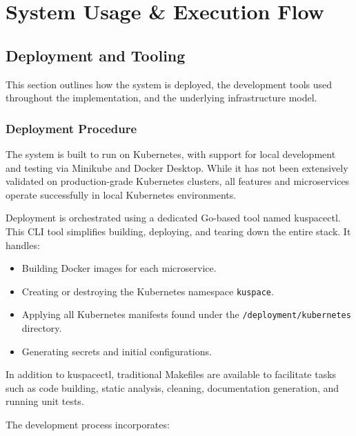 \chapter{System Usage \& Execution Flow}
\section{Deployment and Tooling}

This section outlines how the system is deployed, the development tools used 
throughout the implementation, and the underlying infrastructure model.

\subsection{Deployment Procedure}

The system is built to run on Kubernetes, with support for local development and testing via Minikube and Docker Desktop. While it has not been extensively validated on production-grade Kubernetes clusters, all features and microservices operate successfully in local Kubernetes environments.

Deployment is orchestrated using a dedicated Go-based tool named kuspacectl. This CLI tool simplifies building, deploying, and tearing down the entire stack. It handles:

\begin{itemize}
\item Building Docker images for each microservice.
\item Creating or destroying the Kubernetes namespace \texttt{kuspace}.
\item Applying all Kubernetes manifests found under the 
\texttt{/deployment/kubernetes} directory.
\item Generating secrets and initial configurations.
\end{itemize}

In addition to kuspacectl, traditional Makefiles are available to facilitate tasks such as code building, static analysis, cleaning, documentation generation, and running unit tests.

The development process incorporates:

